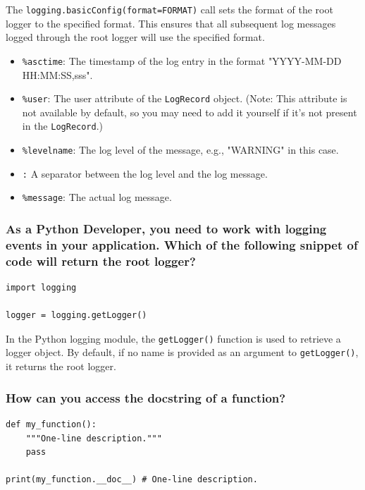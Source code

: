 The \texttt{logging.basicConfig(format=FORMAT)} call sets the format of the root logger to the specified format. This ensures that all subsequent log messages logged through the root logger will use the specified format.
\begin{itemize}
    \item \texttt{\%asctime}: The timestamp of the log entry in the format "YYYY-MM-DD HH:MM:SS,sss".
    \item \texttt{\%user}: The user attribute of the \texttt{LogRecord} object. (Note: This attribute is not available by default, so you may need to add it yourself if it's not present in the \texttt{LogRecord}.)
    \item \texttt{\%levelname}: The log level of the message, e.g., "WARNING" in this case.
    \item \texttt{:} A separator between the log level and the log message.
    \item \texttt{\%message}: The actual log message.
\end{itemize}

\subsubsection{As a Python Developer, you need to work with logging events in your application. Which of the following snippet of code will return the root logger?}
\begin{codebox}
\begin{verbatim}
import logging
 
logger = logging.getLogger()
\end{verbatim}
\end{codebox}
In the Python logging module, the \texttt{getLogger()} function is used to retrieve a logger object. By default, if no name is provided as an argument to \texttt{getLogger()}, it returns the root logger.

\newpage
\subsubsection{How can you access the docstring of a function?}

\begin{codebox}
\begin{verbatim}
def my_function():
    """One-line description."""
    pass

print(my_function.__doc__) # One-line description.
\end{verbatim}
\end{codebox}

